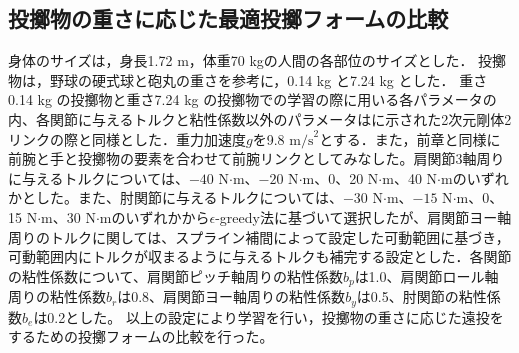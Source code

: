 \begin{small}
\subsection{投擲物の重さに応じた最適投擲フォームの比較}
身体のサイズは，身長1.72 m，体重70 kgの人間の各部位のサイズとした．
投擲物は，野球の硬式球と砲丸の重さを参考に，0.14 kg と7.24 kg とした．
重さ0.14 kg の投擲物と重さ7.24 kg の投擲物での学習の際に用いる各パラメータの内、各関節に与えるトルクと粘性係数以外のパラメータはに示された2次元剛体2リンクの際と同様とした．重力加速度$g$を9.8 $\mathrm{m/s}^{2}$とする．また，前章と同様に前腕と手と投擲物の要素を合わせて前腕リンクとしてみなした。肩関節3軸周りに与えるトルクについては、$-40$ N$\cdot$m、$-20$ N$\cdot$m、0、20 N$\cdot$m、40 N$\cdot$mのいずれかとした。また、肘関節に与えるトルクについては、$-30$ N$\cdot$m、$-15$ N$\cdot$m、0、15 N$\cdot$m、30 N$\cdot$mのいずれかから$\epsilon$-greedy法に基づいて選択したが、肩関節ヨー軸周りのトルクに関しては、スプライン補間によって設定した可動範囲に基づき，可動範囲内にトルクが収まるように与えるトルクも補完する設定とした．各関節の粘性係数について、肩関節ピッチ軸周りの粘性係数$b_{p}$は1.0、肩関節ロール軸周りの粘性係数$b_{r}$は0.8、肩関節ヨー軸周りの粘性係数$b_{y}$は0.5、肘関節の粘性係数$b_{e}$は0.2とした。
以上の設定により学習を行い，投擲物の重さに応じた遠投をするための投擲フォームの比較を行った。

\end{small}
